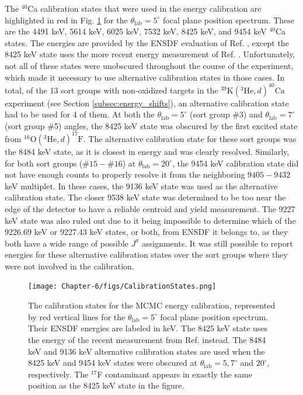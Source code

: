 The $^{40}$Ca calibration states that were used in the energy calibration are highlighted in red in Fig. \ref{fig:Calibration_States} for the $\theta_{\mathrm{lab}} = 5^{\circ}$ focal plane position spectrum. These are the 4491 keV, 5614 keV, 6025 keV, 7532 keV, 8425 keV, and 9454 keV $^{40}$Ca states. The energies are provided by the ENSDF evaluation of Ref. \cite{Chen2017}, except the 8425 keV state uses the more recent energy measurement of Ref. \cite{Gribble2022}. Unfortunately, not all of these states were unobscured throughout the course of the experiment, which made it necessary to use alternative calibration states in those cases. In total, of the 13 sort groups with non-oxidized targets in the $^{39}\mathrm{K}(^{3}\mathrm{He},d)^{40}\mathrm{Ca}$ experiment (see Section \ref{subsec:energy_shifts}), an alternative calibration state had to be used for 4 of them. At both the $\theta_{\mathrm{lab}} = 5^{\circ}$ (sort group $\#$3) and $\theta_{\mathrm{lab}} = 7^{\circ}$ (sort group $\#$5) angles, the 8425 keV state was obscured by the first excited state from $^{16}\mathrm{O}(^{3}\mathrm{He},d)^{17}\mathrm{F}$. The alternative calibration state for these sort groups was the 8484 keV state, as it is closest in energy and was clearly resolved. Similarly, for both sort groups ($\#15-\#16$) at $\theta_{\mathrm{lab}} = 20^{\circ}$, the 9454 keV calibration state did not have enough counts to properly resolve it from the neighboring $9405-9432$ keV multiplet. In these cases, the 9136 keV state was used as the alternative calibration state. The closer 9538 keV state was determined to be too near the edge of the detector to have a reliable centroid and yield measurement. The 9227 keV state was also ruled out due to it being impossible to determine which of the 9226.69 keV or 9227.43 keV states, or both, from ENSDF it belongs to, as they both have a wide range of possible $J^{\pi}$ assignments. It was still possible to report energies for these alternative calibration states over the sort groups where they were not involved in the calibration.

\begin{figure}[t]
\centering
\texttt{[image: Chapter-6/figs/CalibrationStates.png]}
\caption{\label{fig:Calibration_States}The calibration states for the MCMC energy calibration, represented by red vertical lines for the $\theta_{\mathrm{lab}} = 5^{\circ}$ focal plane position spectrum. Their ENSDF \cite{Chen2017} energies are labeled in keV. The 8425 keV state uses the energy of the recent measurement from Ref. \cite{Gribble2022} instead. The 8484 keV and 9136 keV alternative calibration states are used when the 8425 keV and 9454 keV states were obscured at $\theta_{\mathrm{lab}} = 5,7^{\circ}$ and $20^{\circ}$, respectively. The $^{17}$F contaminant appears in exactly the same position as the 8425 keV state in the figure.}
\end{figure}

